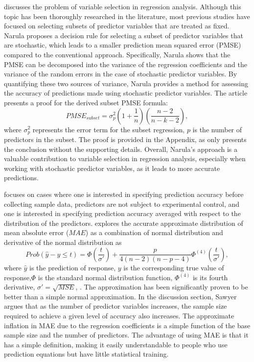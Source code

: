 \cite{narula1974predictive} discusses the problem of variable selection in regression analysis. Although this topic has been thoroughly researched in the literature, most previous studies have focused on selecting subsets of predictor variables that are treated as fixed. Narula proposes a decision rule for selecting a subset of predictor variables that are stochastic, which leads to a smaller prediction mean squared error (PMSE) compared to the conventional approach. Specifically, Narula shows that the PMSE can be decomposed into the variance of the regression coefficients and the variance of the random errors in the case of stochastic predictor variables. By quantifying these two sources of variance, Narula provides a method for assessing the accuracy of predictions made using stochastic predictor variables. The article presents a proof for the derived subset PMSE formula: 
\begin{equation}\label{eq:narula}
PMSE_{subset} = \sigma_p^2\left(1+\frac{1}{n}\right)\left(\frac{n-2}{n-k-2}\right),\end{equation} 
where $\sigma_p^2$ represents the error term for the subset regression, $p$ is the number of predictors in the subset. The proof is provided in the Appendix, as \cite{narula1974predictive} only presents the conclusion without the supporting details. Overall, Narula's approach is a valuable contribution to variable selection in regression analysis, especially when working with stochastic predictor variables, as it leads to more accurate predictions.

\cite{sawyer1982sample} focuses on cases where one is interested in specifying prediction accuracy before collecting sample data, predictors are not subject to experimental control, and one is interested in specifying prediction accuracy averaged with respect to the distribution of the predictors.\cite{sawyer1982sample} explores the accurate approximate distribution of mean absolute error ($MAE$) as a combination of normal distribution and derivative of the normal distribution as
\begin{equation}\label{eq:sawyer}
Prob(\hat{y} - y \leq t) = \Phi\left(\frac{t}{\sigma'}\right) + \frac{p}{4(n-2)(n-p-4)}\Phi^{(4)}\left(\frac{t}{\sigma'}\right),\end{equation}
where $\hat{y}$ is the prediction of response, $y$ is the corresponding true value of response,$\Phi$ is the standard normal distribution function, $\Phi^{(4)}$ is its fourth derivative, $\sigma' = \sqrt{MSE}$, 
. The approximation has been significantly proven to be better than a simple normal approximation. In the discussion section, Sawyer argues that as the number of predictor variables increases, the sample size required to achieve a given level of accuracy also increases.  The approximate inflation in MAE due to the regression coefficients is a simple function of the base sample size and the number of predictors. The advantage of using MAE is that it has a simple definition, making it easily understandable to people who use prediction equations but have little statistical training. 


